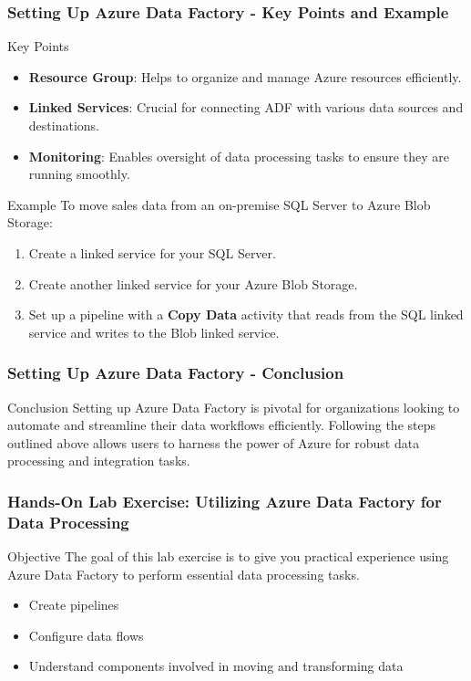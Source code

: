 \documentclass[aspectratio=169]{beamer}
\begin{document}
\begin{frame}[fragile]
    \frametitle{Setting Up Azure Data Factory - Key Points and Example}
    \begin{block}{Key Points}
        \begin{itemize}
            \item \textbf{Resource Group}: Helps to organize and manage Azure resources efficiently.
            \item \textbf{Linked Services}: Crucial for connecting ADF with various data sources and destinations.
            \item \textbf{Monitoring}: Enables oversight of data processing tasks to ensure they are running smoothly.
        \end{itemize}
    \end{block}
    
    \begin{block}{Example}
        To move sales data from an on-premise SQL Server to Azure Blob Storage:
        \begin{enumerate}
            \item Create a linked service for your SQL Server.
            \item Create another linked service for your Azure Blob Storage.
            \item Set up a pipeline with a \textbf{Copy Data} activity that reads from the SQL linked service and writes to the Blob linked service.
        \end{enumerate}
    \end{block}
\end{frame}

\begin{frame}[fragile]
    \frametitle{Setting Up Azure Data Factory - Conclusion}
    \begin{block}{Conclusion}
        Setting up Azure Data Factory is pivotal for organizations looking to automate and streamline their data workflows efficiently. 
        Following the steps outlined above allows users to harness the power of Azure for robust data processing and integration tasks.
    \end{block}
\end{frame}

\begin{frame}[fragile]
    \frametitle{Hands-On Lab Exercise: Utilizing Azure Data Factory for Data Processing}
    
    \begin{block}{Objective}
        The goal of this lab exercise is to give you practical experience using Azure Data Factory to perform essential data processing tasks.
    \end{block}
    
    \begin{itemize}
        \item Create pipelines
        \item Configure data flows
        \item Understand components involved in moving and transforming data
    \end{itemize}
\end{frame}
\end{document}
